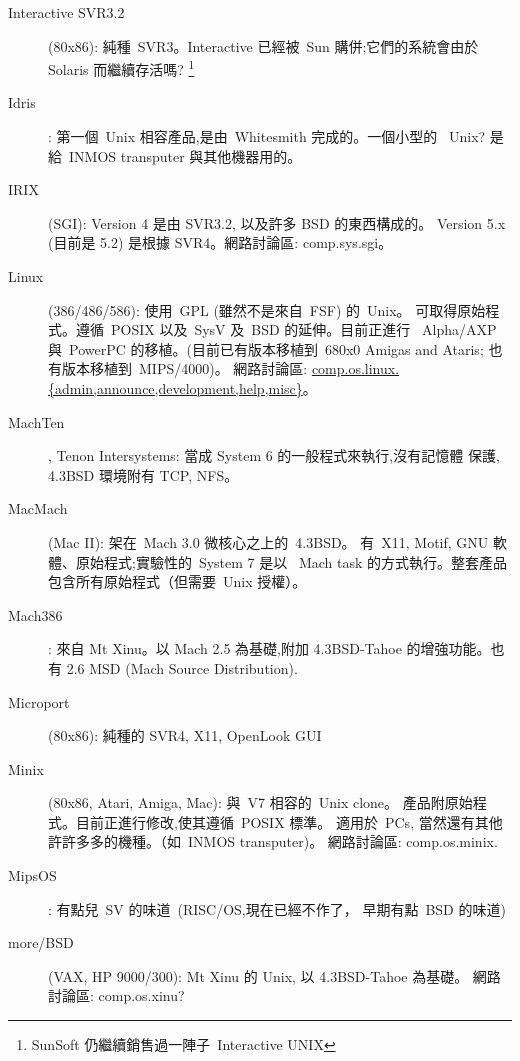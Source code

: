 \documentclass{article}
\begin{document}
\begin{CJK*}{Bg5}{ming}
\begin{description}
      \item [Interactive SVR3.2] (80x86): 純種~SVR3。Interactive 已經被~Sun 
	購併;它們的系統會由於 Solaris 而繼續存活嗎?
        \footnote{SunSoft 仍繼續銷售過一陣子~Interactive UNIX}

      \item [Idris]: 第一個~Unix 相容產品,是由~Whitesmith 完成的。一個小型的
	~Unix? 是給~INMOS transputer 與其他機器用的。

      \item [IRIX] (SGI):  Version 4 是由 SVR3.2, 以及許多 BSD 的東西構成的。
      Version 5.x (目前是 5.2) 是根據 SVR4。網路討論區: comp.sys.sgi。

      \item [Linux] (386/486/586): 使用~GPL (雖然不是來自~FSF) 的~Unix。
        可取得原始程式。遵循~POSIX 以及~SysV 及~BSD 的延伸。目前正進行
       ~Alpha/AXP 與~PowerPC 的移植。(目前已有版本移植到~680x0 Amigas
        and Ataris; 也有版本移植到~MIPS/4000)。
        網路討論區: \url{comp.os.linux.{admin,announce,development,help,misc}}。

      \item [MachTen], Tenon Intersystems: 當成 System 6 的一般程式來執行,沒有記憶體
         保護, 4.3BSD 環境附有 TCP, NFS。

      \item [MacMach] (Mac II): 架在~Mach 3.0 微核心之上的~4.3BSD。
	有~X11, Motif, GNU 軟體、原始程式;實驗性的~System 7 是以
	~Mach task 的方式執行。整套產品包含所有原始程式（但需要~Unix 授權）。

      \item [Mach386]: 來自 Mt Xinu。以 Mach 2.5 為基礎,附加 4.3BSD-Tahoe
         的增強功能。也有 2.6 MSD (Mach Source Distribution).

      \item [Microport] (80x86): 純種的 SVR4, X11, OpenLook GUI

      \item [Minix] (80x86, Atari, Amiga, Mac): 與~V7 相容的~Unix clone。
         產品附原始程式。目前正進行修改,使其遵循~POSIX 標準。
         適用於~PCs, 當然還有其他許許多多的機種。（如~INMOS transputer)。
         網路討論區: comp.os.minix.

      \item [MipsOS]: 有點兒~SV 的味道~(RISC/OS,現在已經不作了，
		早期有點~BSD 的味道)

      \item [more/BSD] (VAX, HP 9000/300):  Mt Xinu 的 Unix, 以 4.3BSD-Tahoe 為基礎。
         網路討論區: comp.os.xinu?


\end{description}
\end{CJK*}
\end{document}
